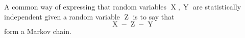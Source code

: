 A common way of expressing that random variables $\operatorname{X}, \operatorname{Y}$ are statistically independent given a random variable $\operatorname{Z}$  is to say that
$$\operatorname{X} - \operatorname{Z} - \operatorname{Y}$$ 
form a Markov chain.
